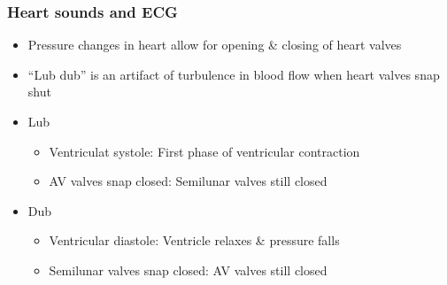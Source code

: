 \documentclass[11pt,fleqn]{book}
\begin{document}
\subsubsection{Heart sounds and ECG}
\begin{itemize}
    \item Pressure changes in heart
allow for opening \& closing of
heart valves
    \item \enquote{Lub dub} is an artifact of
turbulence in blood flow
when heart valves snap shut
\end{itemize}
\begin{itemize}
    \item Lub
    \begin{itemize}
        \item Ventriculat systole: First phase of
ventricular contraction
        \item AV valves snap closed: Semilunar valves still
closed
    \end{itemize}
    \item Dub
    \begin{itemize}
        \item Ventricular diastole: Ventricle relaxes \&
pressure falls
        \item Semilunar valves snap closed: AV valves still closed
    \end{itemize}
\end{itemize}
\end{document}

